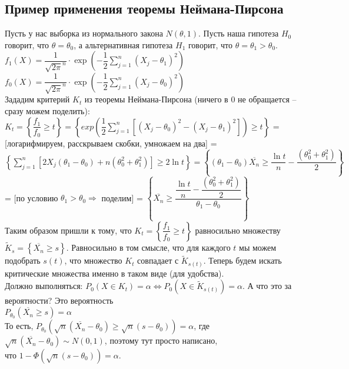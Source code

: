 \subsection{Пример применения теоремы Неймана-Пирсона}
\begin{example}
    Пусть у нас выборка из нормального закона $N(\theta, 1)$. Пусть наша гипотеза $H_0$ говорит, что
    $\theta = \theta_0$, а альтернативная гипотеза $H_1$ говорит, что $\theta = \theta_1 > \theta_0$. \\
    
    $f_1(X) = \dfrac{1}{\sqrt{2\pi}^n} \cdot \exp(-\dfrac{1}{2} \sum_{j = 1}^{n} (X_j - \theta_1)^2)$ \\
    $f_0(X) = \dfrac{1}{\sqrt{2\pi}^n} \cdot \exp(-\dfrac{1}{2} \sum_{j = 1}^{n} (X_j - \theta_0)^2)$ \\

    Зададим критерий $K_t$ из теоремы Неймана-Пирсона (ничего в 0 не обращается --
    сразу можем поделить): \\ $K_t = \left\{\dfrac{f_1}{f_0} \geqslant t\right\} =
    \left \{exp \left( \dfrac{1}{2} \sum_{j = 1}^{n}[(X_j - \theta_0)^2 - (X_j - \theta_1)^2] \right) \geqslant t \right \}$ =
    [логарифмируем, расскрываем скобки, умножаем на два]  = $\left \{\sum_{j = 1}^n[2X_j(\theta_1 - \theta_0) +
     n(\theta_0^2 + \theta_1^2)] \geqslant 2\ln t \right \} =
     \left \{(\theta_1 - \theta_0) \overline{X_n} \geqslant \dfrac{\ln t}{n} - \dfrac{(\theta_0^2 + \theta_1^2)}{2} \right \}$
     = [по условию $\theta_1 > \theta_0 \Rightarrow$ поделим] =
     $\left \{\overline{X_n} \geqslant \dfrac{\dfrac{\ln t}{n} - \dfrac{(\theta_0^2 + \theta_1^2)}{2}}{\theta_1 - \theta_0} \right \}$ \\
     
     Таким образом пришли к тому, что $K_t =\left\{\dfrac{f_1}{f_0} \geqslant t\right\}$ равносильно
     множеству $\widetilde{K}_{s} = \left \{\overline{X_n} \geqslant s \right \}$. Равносильно в
     том смысле, что для каждого $t$ мы можем подобрать $s(t)$, что множество $K_t$ совпадает с
     $\widetilde{K}_{s(t)}$. Теперь будем искать критические множества именно в таком виде (для удобства). \\
     
    Должно выполняться: $P_0(X \in K_t) = \alpha \Leftrightarrow P_0(X \in \widetilde{K}_{s(t)}) = \alpha$.
    А что это за вероятности? Это вероятность \\ $P_{\theta_0}(\overline{X_n} \geqslant s) = \alpha$ \\
    То есть, $P_{\theta_0}(\sqrt{n}(\overline{X_n} - \theta_0) \geqslant \sqrt{n}(s - \theta_0)) = \alpha$,
    где $\sqrt{n}(\overline{X_n} - \theta_0) \sim N(0, 1)$, поэтому тут просто написано,\\ что
    $1 - \Phi(\sqrt{n}(s - \theta_0)) = \alpha$. \\
    

\end{example}
